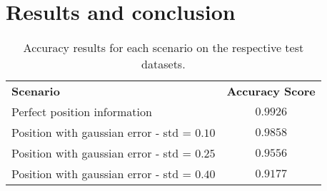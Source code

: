 \documentclass{kthreport}
\theoremstyle{definition}
\begin{document}
\section{Results and conclusion}

\begin{table}[hb]
	\centering
	\begin{tabular}{|l|c|}
		\hline 
		\textbf{Scenario} & \textbf{Accuracy Score} \\ 
		Perfect position information & $0.9926$ \\ 
		Position with gaussian error - std = $0.10$ & $0.9858$ \\ 
		Position with gaussian error - std = $0.25$ & $0.9556$ \\ 
		Position with gaussian error - std = $0.40$ & $0.9177$ \\ 
		\hline 
	\end{tabular}
	\caption{Accuracy results for each scenario on the respective test datasets.}
\end{table}
\end{document}
